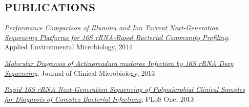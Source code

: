 \documentclass{res}
\begin{document}
\begin{resume}
\section{PUBLICATIONS}
\renewcommand{\section}[2]{}
\begin{thebibliography}{4}
    \href{http://aem.asm.org/content/80/24/7583}
         {\textit{Performance Comparison of Illumina and Ion Torrent 
                  Next-Generation Sequencing Platforms for 16S rRNA-Based 
                  Bacterial Community Profiling}},
         Applied Environmental Microbiology, 2014

    \href{http://jcm.asm.org/content/51/12/4262}
         {\textit{Molecular Diagnosis of Actinomadura madurae 
                  Infection by 16S rRNA Deep Sequencing}},
         Journal of Clinical Microbiology, 2013

    \href{http://journals.plos.org/plosone/article?id=10.1371/journal.pone.0065226}
         {\textit{Rapid 16S rRNA Next-Generation Sequencing of Polymicrobial 
                  Clinical Samples for Diagnosis of Complex Bacterial Infections}},
         PLoS One, 2013
\end{thebibliography}
\nocite{*}

\end{resume}
\end{document}
